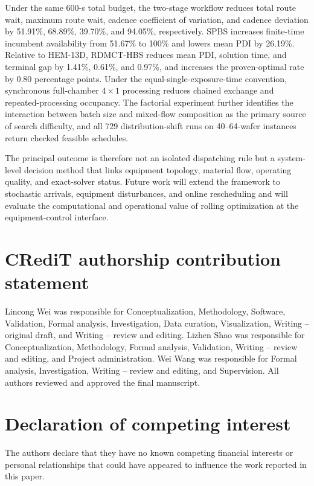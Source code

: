 \documentclass[final,5p,times,twocolumn]{elsarticle}
\newcommand{\method}{RDMCT-HBS}
\begin{document}
Under the same 600-s total budget, the two-stage workflow reduces total route wait, maximum route wait, cadence coefficient of variation, and cadence deviation by 51.91\%, 68.89\%, 39.70\%, and 94.05\%, respectively. SPBS increases finite-time incumbent availability from 51.67\% to 100\% and lowers mean PDI by 26.19\%. Relative to HEM-13D, \method{} reduces mean PDI, solution time, and terminal gap by 1.41\%, 0.61\%, and 0.97\%, and increases the proven-optimal rate by 0.80 percentage points. Under the equal-single-exposure-time convention, synchronous full-chamber $4\times1$ processing reduces chained exchange and repeated-processing occupancy. The factorial experiment further identifies the interaction between batch size and mixed-flow composition as the primary source of search difficulty, and all 729 distribution-shift runs on 40--64-wafer instances return checked feasible schedules.

The principal outcome is therefore not an isolated dispatching rule but a system-level decision method that links equipment topology, material flow, operating quality, and exact-solver status. Future work will extend the framework to stochastic arrivals, equipment disturbances, and online rescheduling and will evaluate the computational and operational value of rolling optimization at the equipment-control interface.

\section*{CRediT authorship contribution statement}
Lincong Wei was responsible for Conceptualization, Methodology, Software,
Validation, Formal analysis, Investigation, Data curation, Visualization,
Writing -- original draft, and Writing -- review and editing. Lizhen Shao was
responsible for Conceptualization, Methodology, Formal analysis, Validation,
Writing -- review and editing, and Project administration. Wei Wang was
responsible for Formal analysis, Investigation, Writing -- review and editing,
and Supervision. All authors reviewed and approved the final manuscript.

\section*{Declaration of competing interest}
The authors declare that they have no known competing financial interests or
personal relationships that could have appeared to influence the work
reported in this paper.
\end{document}
